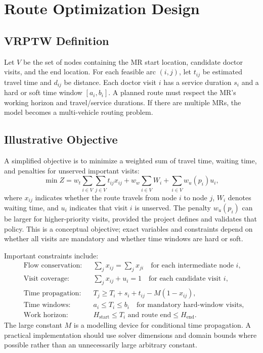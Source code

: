 \documentclass[12pt,a4paper,oneside]{report}
\begin{document}
\section{Route Optimization Design}
\subsection{VRPTW Definition}
Let $V$ be the set of nodes containing the MR start location, candidate doctor visits, and the end location. For each feasible arc $(i,j)$, let $t_{ij}$ be estimated travel time and $d_{ij}$ be distance. Each doctor visit $i$ has a service duration $s_i$ and a hard or soft time window $[a_i,b_i]$. A planned route must respect the MR's working horizon and travel/service durations. If there are multiple MRs, the model becomes a multi-vehicle routing problem.

\subsection{Illustrative Objective}
A simplified objective is to minimize a weighted sum of travel time, waiting time, and penalties for unserved important visits:
\begin{equation}
\min Z = w_t\sum_{i\in V}\sum_{j\in V} t_{ij}x_{ij} + w_w\sum_{i\in V} W_i + \sum_{i\in V} w_u(p_i)u_i,
\label{eq:objective}
\end{equation}
where $x_{ij}$ indicates whether the route travels from node $i$ to node $j$, $W_i$ denotes waiting time, and $u_i$ indicates that visit $i$ is unserved. The penalty $w_u(p_i)$ can be larger for higher-priority visits, provided the project defines and validates that policy. This is a conceptual objective; exact variables and constraints depend on whether all visits are mandatory and whether time windows are hard or soft.

Important constraints include:
\begin{align}
&\text{Flow conservation:} && \sum_j x_{ij} = \sum_j x_{ji} \quad \text{for each intermediate node } i,\\
&\text{Visit coverage:} && \sum_j x_{ij} + u_i = 1 \quad \text{for each candidate visit } i,\\
&\text{Time propagation:} && T_j \geq T_i+s_i+t_{ij}-M(1-x_{ij}),\\
&\text{Time windows:} && a_i \leq T_i \leq b_i \quad \text{for mandatory hard-window visits},\\
&\text{Work horizon:} && H_{\text{start}} \leq T_i \text{ and route end} \leq H_{\text{end}}.
\end{align}
The large constant $M$ is a modelling device for conditional time propagation. A practical implementation should use solver dimensions and domain bounds where possible rather than an unnecessarily large arbitrary constant.
\end{document}
